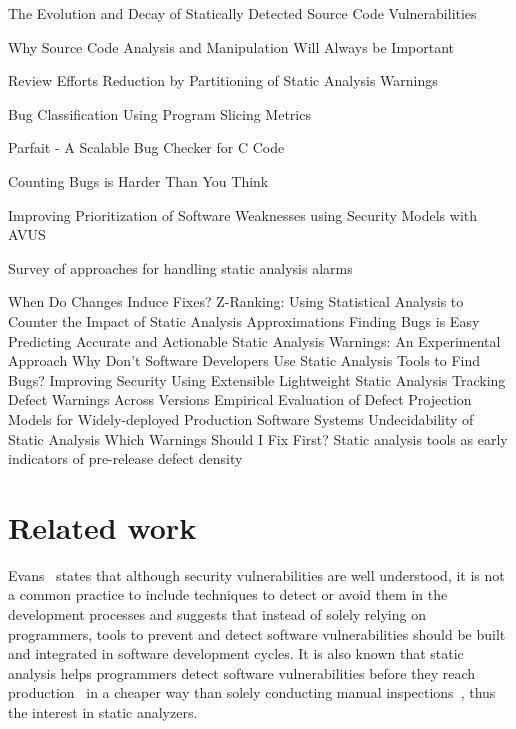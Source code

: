 The Evolution and Decay of Statically Detected Source Code Vulnerabilities~\cite{penta_evolution_2008}

Why Source Code Analysis and Manipulation Will Always be Important~\cite{harman2010source}

Review Efforts Reduction by Partitioning of Static Analysis Warnings~\cite{muske2013review}

Bug Classification Using Program Slicing Metrics~\cite{pan_bug_2006}

Parfait - A Scalable Bug Checker for C Code~\cite{cifuentes2008parfait}

Counting Bugs is Harder Than You Think~\cite{black_counting_2011}

Improving Prioritization of Software Weaknesses using Security Models with AVUS~\cite{renatus2015improving}

Survey of approaches for handling static analysis alarms~\cite{muske2016survey}

When Do Changes Induce Fixes?
Z-Ranking: Using Statistical Analysis to Counter the Impact of Static Analysis Approximations
Finding Bugs is Easy
Predicting Accurate and Actionable Static Analysis Warnings: An Experimental Approach
Why Don’t Software Developers Use Static Analysis Tools to Find Bugs?
Improving Security Using Extensible Lightweight Static Analysis
Tracking Defect Warnings Across Versions
Empirical Evaluation of Defect Projection Models for Widely-deployed Production Software Systems
Undecidability of Static Analysis
Which Warnings Should I Fix First?
Static analysis tools as early indicators of pre-release defect density~\cite{} \\




\section{Related work}
\label{sec:related_work}

Evans~\cite{evans_improving_2002} states that although security vulnerabilities
are well understood, it is not a common practice to include techniques to detect
or avoid them in the development processes and suggests that instead of solely
relying on programmers, tools to prevent and detect software vulnerabilities
should be built and integrated in software development cycles. It is also
known that static analysis helps programmers detect software vulnerabilities
before they reach production~\cite{evans_improving_2002} in a cheaper way than
solely conducting manual inspections~\cite{johnson_why_2013}, thus the interest
in static analyzers.

